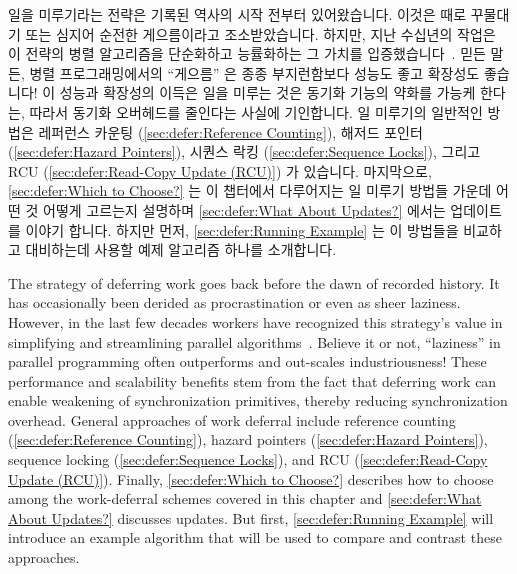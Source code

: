 
%

일을 미루기라는 전략은 기록된 역사의 시작 전부터 있어왔습니다.
이것은 때로 꾸물대기 또는 심지어 순전한 게으름이라고 조소받았습니다.
하지만, 지난 수십년의 작업은 이 전략의 병렬 알고리즘을 단순화하고 능률화하는 그
가치를 입증했습니다~\cite{Kung80,HMassalinPhD}.
믿든 말든, 병렬 프로그래밍에서의 ``게으름'' 은 종종 부지런함보다 성능도 좋고
확장성도 좋습니다!
이 성능과 확장성의 이득은 일을 미루는 것은 동기화 기능의 약화를 가능케 한다는,
따라서 동기화 오버헤드를 줄인다는 사실에 기인합니다.
일 미루기의 일반적인 방법은 레퍼런스 카운팅 (\cref{sec:defer:Reference Counting}),
해저드 포인터 (\cref{sec:defer:Hazard Pointers}),
시퀀스 락킹 (\cref{sec:defer:Sequence Locks}),
그리고 RCU (\cref{sec:defer:Read-Copy Update (RCU)}) 가 있습니다.
마지막으로, \cref{sec:defer:Which to Choose?}
는 이 챕터에서 다루어지는 일 미루기 방법들 가운데 어떤 것 어떻게 고르는지
설명하며
\cref{sec:defer:What About Updates?} 에서는 업데이트를 이야기 합니다.
하지만 먼저,
\cref{sec:defer:Running Example} 는 이 방법들을 비교하고 대비하는데 사용할 예제
알고리즘 하나를 소개합니다.

\iffalse

The strategy of deferring work goes back before the dawn of recorded
history. It has occasionally been derided as procrastination or
even as sheer laziness.
However, in the last few decades workers have recognized this strategy's value
in simplifying and streamlining parallel algorithms~\cite{Kung80,HMassalinPhD}.
Believe it or not, ``laziness'' in parallel programming often outperforms and
out-scales industriousness!
These performance and scalability benefits stem from the fact that
deferring work can enable weakening of synchronization primitives,
thereby reducing synchronization overhead.
General approaches of work deferral include
reference counting (\cref{sec:defer:Reference Counting}),
hazard pointers (\cref{sec:defer:Hazard Pointers}),
sequence locking (\cref{sec:defer:Sequence Locks}),
and RCU (\cref{sec:defer:Read-Copy Update (RCU)}).
Finally, \cref{sec:defer:Which to Choose?}
describes how to choose among the work-deferral schemes covered in
this chapter and \cref{sec:defer:What About Updates?}
discusses updates.
But first, \cref{sec:defer:Running Example} will introduce an example
algorithm that will be used to compare and contrast these approaches.

